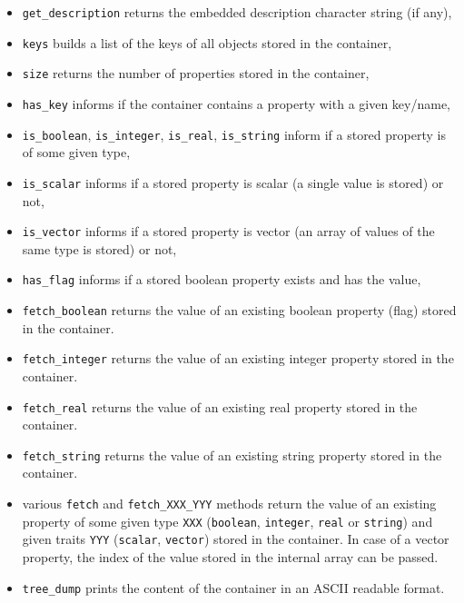 \begin{itemize}

\item  \texttt{get\_description}   returns  the  embedded  description
  character string (if any),

\item \texttt{keys} builds a list of the keys of all objects stored in
  the container,

\item  \texttt{size} returns the  number of  properties stored  in the
  container,

\item \texttt{has\_key} informs if  the container contains a property
  with a given key/name,

\item  \texttt{is\_boolean},  \texttt{is\_integer}, \texttt{is\_real},
  \texttt{is\_string} inform  if a stored  property is of  some given
  type,

\item \texttt{is\_scalar}  informs if a  stored property is  scalar (a
  single value is stored) or not,

\item \texttt{is\_vector}  informs if a stored property  is vector (an
  array of values of the same type is stored) or not,

\item \texttt{has\_flag}  informs if a stored  boolean property exists
  and has the  value,

\item \texttt{fetch\_boolean} returns the value of an existing boolean
  property (flag) stored in the container.

\item \texttt{fetch\_integer} returns the value of an existing integer
  property stored in the container.

\item  \texttt{fetch\_real}  returns the  value  of  an existing  real
  property stored in the container.

\item \texttt{fetch\_string}  returns the value of  an existing string
  property stored in the container.

\item  various  \texttt{fetch}  and  \texttt{fetch\_XXX\_YYY}  methods
  return  the  value  of  an  existing property  of  some  given  type
  \texttt{XXX}  (\texttt{boolean}, \texttt{integer},  \texttt{real} or
  \texttt{string})  and   given  traits  \texttt{YYY}  (\texttt{scalar},
  \texttt{vector})  stored in  the  container.  In  case  of a  vector
  property, the index of the value stored in the internal array can be passed.

\item \texttt{tree\_dump}  prints the content  of the container  in an
  ASCII readable format.

\end{itemize}


